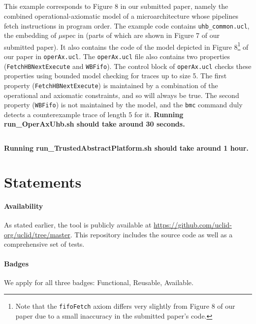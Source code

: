 \documentclass[runningheads]{llncs}
\begin{document}
\subsection{}
This example corresponds to Figure 8 in our submitted paper, namely the combined operational-axiomatic model of a microarchitecture whose pipelines fetch instructions in program order.
The example code contains \texttt{uhb\_common.ucl}, the embedding of $\mu$spec in \uclid (parts of which are shown in Figure 7 of our submitted paper).
It also contains the code of the model depicted in Figure 8\footnote{Note that the \texttt{fifoFetch} axiom differs very slightly from Figure 8 of our paper due to a small inaccuracy in the submitted paper's code.} of our paper in \texttt{operAx.ucl}.
The \texttt{operAx.ucl} file also contains two properties (\texttt{FetchHBNextExecute} and \texttt{WBFifo}). The control block of \texttt{operAx.ucl} checks these properties using bounded model checking for traces up to size 5.
The first property (\texttt{FetchHBNextExecute}) is maintained by a combination of the operational and axiomatic constraints, and so will always be true.
The second property (\texttt{WBFifo}) is not maintained by the model, and the \texttt{bmc} command duly detects a counterexample trace of length 5 for it.
\textbf{Running run\_OperAxUhb.sh should take around 30 seconds.}

\subsection{}

\textbf{Running run\_TrustedAbstractPlatform.sh should take around 1 hour.}

\section{Statements}
\paragraph{Availability}
As stated earlier, the \uclidcmd tool is publicly available at \url{https://github.com/uclid-org/uclid/tree/master}. This repository includes the source code as well as a comprehensive set of tests.

\paragraph{Badges}

We apply for all three badges: Functional, Reusable, Available.
\end{document}

